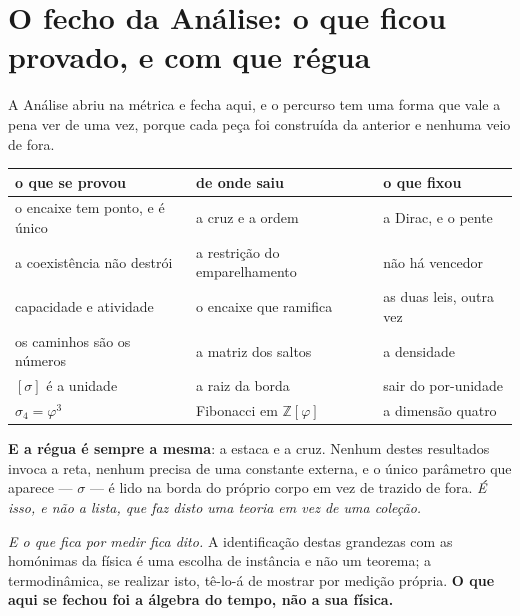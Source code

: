 \documentclass[livro.tex]{subfiles}
\begin{document}



\section{O fecho da Análise: o que ficou provado, e com que régua}\label{sec:fechoanalise}

\noindent A Análise abriu na métrica e fecha aqui, e o percurso tem uma forma que vale a pena ver
de uma vez, porque cada peça foi construída da anterior e nenhuma veio de fora.

\begin{center}\small
\begin{tabular}{@{}lll@{}}
\toprule
\textbf{o que se provou} & \textbf{de onde saiu} & \textbf{o que fixou} \\
\midrule
o encaixe tem ponto, e é único & a cruz e a ordem & a Dirac, e o pente \\
a coexistência não destrói & a restrição do emparelhamento & não há vencedor \\
capacidade e atividade & o encaixe que ramifica & as duas leis, outra vez \\
os caminhos são os números & a matriz dos saltos & a densidade \\
$[\sigma]$ é a unidade & a raiz da borda & sair do por-unidade \\
$\sigma_4=\varphi^{3}$ & Fibonacci em $\mathbb{Z}[\varphi]$ & a dimensão quatro \\
\bottomrule
\end{tabular}
\end{center}

\noindent \textbf{E a régua é sempre a mesma}: a estaca e a cruz. Nenhum destes resultados invoca
a reta, nenhum precisa de uma constante externa, e o único parâmetro que aparece --- $\sigma$ ---
é lido na borda do próprio corpo em vez de trazido de fora. \emph{É isso, e não a lista, que faz
disto uma teoria em vez de uma coleção.}

\medskip
\noindent \emph{E o que fica por medir fica dito.} A identificação destas grandezas com as
homónimas da física é uma escolha de instância e não um teorema; a termodinâmica, se realizar isto,
tê-lo-á de mostrar por medição própria. \textbf{O que aqui se fechou foi a álgebra do tempo, não a
sua física.}

\end{document}
